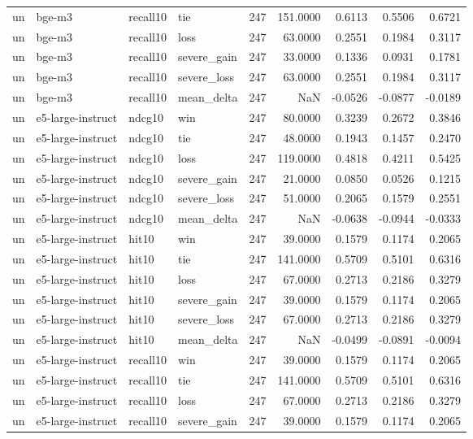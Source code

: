 \begin{tabular}{llllrrrrr}
un & bge-m3 & recall10 & tie & 247 & 151.0000 & 0.6113 & 0.5506 & 0.6721 \\
un & bge-m3 & recall10 & loss & 247 & 63.0000 & 0.2551 & 0.1984 & 0.3117 \\
un & bge-m3 & recall10 & severe\_gain & 247 & 33.0000 & 0.1336 & 0.0931 & 0.1781 \\
un & bge-m3 & recall10 & severe\_loss & 247 & 63.0000 & 0.2551 & 0.1984 & 0.3117 \\
un & bge-m3 & recall10 & mean\_delta & 247 & NaN & -0.0526 & -0.0877 & -0.0189 \\
un & e5-large-instruct & ndcg10 & win & 247 & 80.0000 & 0.3239 & 0.2672 & 0.3846 \\
un & e5-large-instruct & ndcg10 & tie & 247 & 48.0000 & 0.1943 & 0.1457 & 0.2470 \\
un & e5-large-instruct & ndcg10 & loss & 247 & 119.0000 & 0.4818 & 0.4211 & 0.5425 \\
un & e5-large-instruct & ndcg10 & severe\_gain & 247 & 21.0000 & 0.0850 & 0.0526 & 0.1215 \\
un & e5-large-instruct & ndcg10 & severe\_loss & 247 & 51.0000 & 0.2065 & 0.1579 & 0.2551 \\
un & e5-large-instruct & ndcg10 & mean\_delta & 247 & NaN & -0.0638 & -0.0944 & -0.0333 \\
un & e5-large-instruct & hit10 & win & 247 & 39.0000 & 0.1579 & 0.1174 & 0.2065 \\
un & e5-large-instruct & hit10 & tie & 247 & 141.0000 & 0.5709 & 0.5101 & 0.6316 \\
un & e5-large-instruct & hit10 & loss & 247 & 67.0000 & 0.2713 & 0.2186 & 0.3279 \\
un & e5-large-instruct & hit10 & severe\_gain & 247 & 39.0000 & 0.1579 & 0.1174 & 0.2065 \\
un & e5-large-instruct & hit10 & severe\_loss & 247 & 67.0000 & 0.2713 & 0.2186 & 0.3279 \\
un & e5-large-instruct & hit10 & mean\_delta & 247 & NaN & -0.0499 & -0.0891 & -0.0094 \\
un & e5-large-instruct & recall10 & win & 247 & 39.0000 & 0.1579 & 0.1174 & 0.2065 \\
un & e5-large-instruct & recall10 & tie & 247 & 141.0000 & 0.5709 & 0.5101 & 0.6316 \\
un & e5-large-instruct & recall10 & loss & 247 & 67.0000 & 0.2713 & 0.2186 & 0.3279 \\
un & e5-large-instruct & recall10 & severe\_gain & 247 & 39.0000 & 0.1579 & 0.1174 & 0.2065 \\

\end{tabular}
